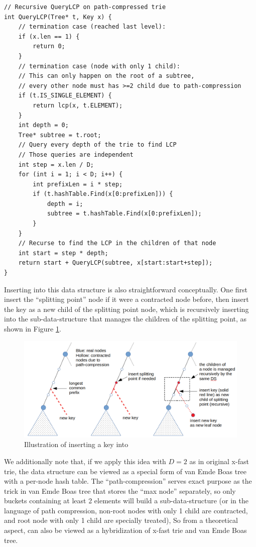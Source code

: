 \documentclass[11pt, usletter]{article}
\begin{document}
\singlespacing\begin{codebox}
\begin{verbatim}
// Recursive QueryLCP on path-compressed trie
int QueryLCP(Tree* t, Key x) {
    // termination case (reached last level):
    if (x.len == 1) {
        return 0;
    }
    // termination case (node with only 1 child):
    // This can only happen on the root of a subtree,
    // every other node must has >=2 child due to path-compression
    if (t.IS_SINGLE_ELEMENT) {
        return lcp(x, t.ELEMENT);
    }
    int depth = 0; 
    Tree* subtree = t.root;
    // Query every depth of the trie to find LCP
    // Those queries are independent
    int step = x.len / D;
    for (int i = 1; i < D; i++) {
        int prefixLen = i * step;
        if (t.hashTable.Find(x[0:prefixLen])) {
            depth = i;
            subtree = t.hashTable.Find(x[0:prefixLen]);
        }
    }
    // Recurse to find the LCP in the children of that node
    int start = step * depth;
    return start + QueryLCP(subtree, x[start:start+step]);
}
\end{verbatim}
\end{codebox}\doublespacing

Inserting into this data structure is also straightforward conceptually. 
One first insert the ``splitting point'' node if it were a contracted node before,  
then insert the key as a new child of the splitting point node, 
which is recursively inserting into the sub-data-structure that manages the children of the splitting point, 
as shown in Figure \ref{mlpindex_insert}.

\begin{figure}[!htb]
  \includegraphics[width=\linewidth]{mlpindex_insert.png}
\caption{Illustration of inserting a key into \MlpIndex}
\label{mlpindex_insert}
\end{figure}

We additionally note that, if we apply this idea with $D=2$ as in original x-fast trie, 
the data structure can be viewed as a special form of van Emde Boas tree \cite{vebtree} with a per-node hash table.
The ``path-compression'' serves exact purpose as the trick in van Emde Boas tree that stores the ``max node'' separately, 
so only buckets containing at least 2 elements will build a sub-data-structure 
(or in the language of path compression, non-root nodes with only 1 child are contracted, 
and root node with only 1 child are specially treated), 
So from a theoretical aspect, \MlpIndex can also be viewed as a hybridization of x-fast trie and van Emde Boas tree.
\end{document}
